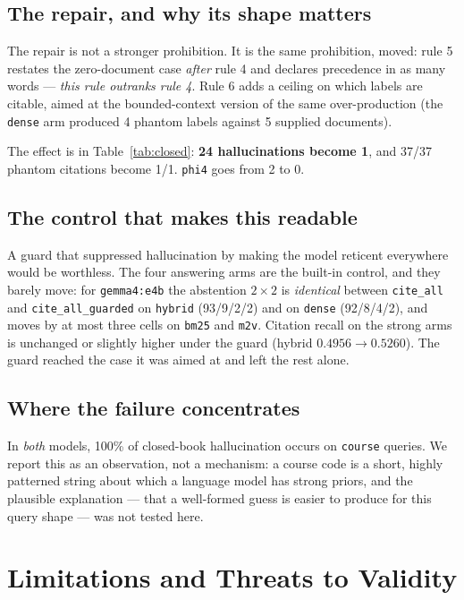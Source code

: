 \documentclass[conference]{IEEEtran}
\begin{document}
\subsection{The repair, and why its shape matters}

The repair is not a stronger prohibition. It is the same prohibition, moved:
rule 5 restates the zero-document case \emph{after} rule 4 and declares
precedence in as many words --- \emph{this rule outranks rule 4}. Rule 6 adds a
ceiling on which labels are citable, aimed at the bounded-context version of the
same over-production (the \texttt{dense} arm produced 4 phantom labels against 5
supplied documents).

The effect is in Table~\ref{tab:closed}: \textbf{24 hallucinations become 1}, and
37/37 phantom citations become 1/1. \texttt{phi4} goes from 2 to 0.

\subsection{The control that makes this readable}

A guard that suppressed hallucination by making the model reticent everywhere
would be worthless. The four answering arms are the built-in control, and they
barely move: for \texttt{gemma4:e4b} the abstention $2\times2$ is \emph{identical}
between \texttt{cite\_all} and \texttt{cite\_all\_guarded} on \texttt{hybrid}
(93/9/2/2) and on \texttt{dense} (92/8/4/2), and moves by at most three cells on
\texttt{bm25} and \texttt{m2v}. Citation recall on the strong arms is unchanged or
slightly higher under the guard (hybrid $0.4956 \rightarrow 0.5260$). The guard
reached the case it was aimed at and left the rest alone.

\subsection{Where the failure concentrates}

In \emph{both} models, 100\% of closed-book hallucination occurs on
\texttt{course} queries. We report this as an observation, not a mechanism: a
course code is a short, highly patterned string about which a language model has
strong priors, and the plausible explanation --- that a well-formed guess is
easier to produce for this query shape --- was not tested here.

\section{Limitations and Threats to Validity}
\label{sec:limits}
\end{document}
